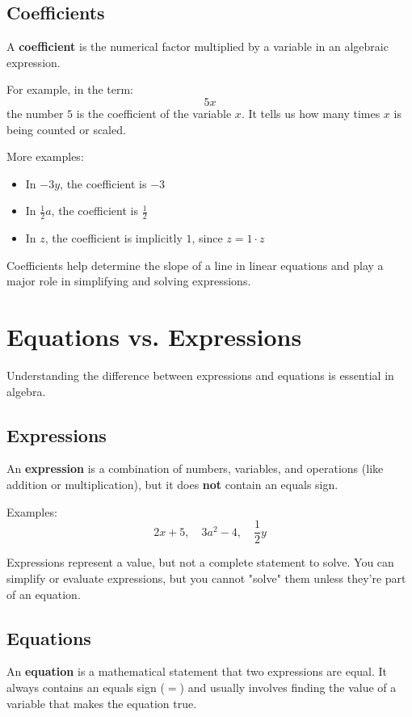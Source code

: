 \documentclass[11pt]{article}
\begin{document}
\subsection{Coefficients}

A \textbf{coefficient} is the numerical factor multiplied by a variable in an algebraic expression.

For example, in the term:
\[
5x
\]
the number \( 5 \) is the coefficient of the variable \( x \). It tells us how many times \( x \) is being counted or scaled.

More examples:
\begin{itemize}
  \item In \( -3y \), the coefficient is \( -3 \)
  \item In \( \frac{1}{2}a \), the coefficient is \( \frac{1}{2} \)
  \item In \( z \), the coefficient is implicitly \( 1 \), since \( z = 1 \cdot z \)
\end{itemize}

Coefficients help determine the slope of a line in linear equations and play a major role in simplifying and solving expressions.
\section{Equations vs. Expressions}

Understanding the difference between expressions and equations is essential in algebra.
\subsection{Expressions}

An \textbf{expression} is a combination of numbers, variables, and operations (like addition or multiplication), but it does \textbf{not} contain an equals sign.

Examples:
\[
2x + 5,\quad 3a^2 - 4,\quad \frac{1}{2}y
\]

Expressions represent a value, but not a complete statement to solve. You can simplify or evaluate expressions, but you cannot "solve" them unless they're part of an equation.

\subsection{Equations}

An \textbf{equation} is a mathematical statement that two expressions are equal. It always contains an equals sign (\( = \)) and usually involves finding the value of a variable that makes the equation true.
\end{document}
